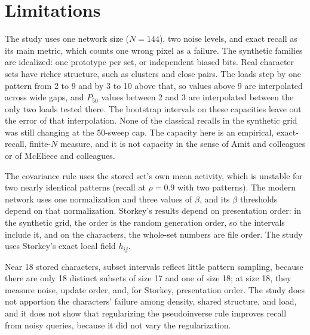 \section{Limitations}

The study uses one network size ($N = 144$), two noise levels, and exact recall as its main metric, which counts one wrong pixel as a failure. The synthetic families are idealized: one prototype per set, or independent biased bits. Real character sets have richer structure, such as clusters and close pairs. The loads step by one pattern from 2 to 9 and by 3 to 10 above that, so values above 9 are interpolated across wide gaps, and $P_{50}$ values between 2 and 3 are interpolated between the only two loads tested there. The bootstrap intervals on these capacities leave out the error of that interpolation. None of the classical recalls in the synthetic grid was still changing at the 50-sweep cap. The capacity here is an empirical, exact-recall, finite-$N$ measure, and it is not capacity in the sense of Amit and colleagues or of McEliece and colleagues.

The covariance rule uses the stored set's own mean activity, which is unstable for two nearly identical patterns (recall  at $\rho = 0.9$ with two patterns). The modern network uses one normalization and three values of $\beta$, and its $\beta$ thresholds depend on that normalization. Storkey's results depend on presentation order: in the synthetic grid, the order is the random generation order, so the intervals include it, and on the characters, the whole-set numbers are file order. The study uses Storkey's exact local field $h_{ij}$.

Near 18 stored characters, subset intervals reflect little pattern sampling, because there are only 18 distinct subsets of size 17 and one of size 18; at size 18, they measure noise, update order, and, for Storkey, presentation order. The study does not apportion the characters' failure among density, shared structure, and load, and it does not show that regularizing the pseudoinverse rule improves recall from noisy queries, because it did not vary the regularization.
